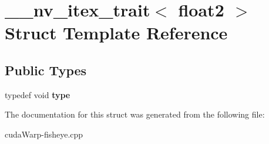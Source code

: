 \hypertarget{struct____nv__itex__trait_3_01float2_01_4}{}\section{\+\_\+\+\_\+nv\+\_\+itex\+\_\+trait$<$ float2 $>$ Struct Template Reference}
\label{struct____nv__itex__trait_3_01float2_01_4}
\subsection*{Public Types}
\begin{DoxyCompactItemize}
\item 
typedef void {\bfseries type}\hypertarget{struct____nv__itex__trait_3_01float2_01_4_a6f53ff1b9293eb3f2864297eafa95f9e}{}\label{struct____nv__itex__trait_3_01float2_01_4_a6f53ff1b9293eb3f2864297eafa95f9e}

\end{DoxyCompactItemize}


The documentation for this struct was generated from the following file\+:\begin{DoxyCompactItemize}
\item 
cuda\+Warp-\/fisheye.\+cpp\end{DoxyCompactItemize}
